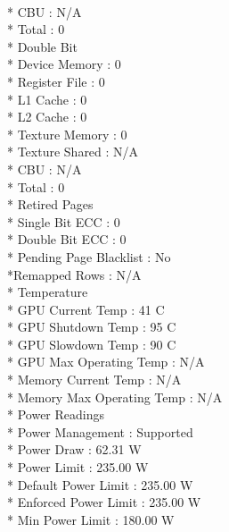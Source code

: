 \documentclass{article}
\begin{document}
           \\*      CBU                       : N/A
           \\*      Total                     : 0
           \\*  Double Bit            
           \\*      Device Memory             : 0
           \\*      Register File             : 0
            \\*     L1 Cache                  : 0
             \\*    L2 Cache                  : 0
            \\*     Texture Memory            : 0
             \\*    Texture Shared            : N/A
            \\*     CBU                       : N/A
            \\*     Total                     : 0
   \\*  Retired Pages
     \\*    Single Bit ECC                    : 0
     \\*    Double Bit ECC                    : 0
      \\*   Pending Page Blacklist            : No
     \\*Remapped Rows                         : N/A
    \\* Temperature
     \\*    GPU Current Temp                  : 41 C
      \\*   GPU Shutdown Temp                 : 95 C
      \\*   GPU Slowdown Temp                 : 90 C
      \\*   GPU Max Operating Temp            : N/A
      \\*   Memory Current Temp               : N/A
     \\*    Memory Max Operating Temp         : N/A
    \\* Power Readings
     \\*    Power Management                  : Supported
     \\*    Power Draw                        : 62.31 W
      \\*   Power Limit                       : 235.00 W
      \\*   Default Power Limit               : 235.00 W
      \\*   Enforced Power Limit              : 235.00 W
      \\*   Min Power Limit                   : 180.00 W
\end{document}
